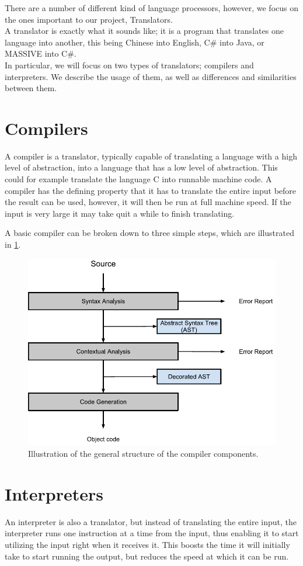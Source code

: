 There are a number of different kind of language processors, however, we focus on the ones important to our project, Translators.\\
A translator is exactly what it sounds like; it is a program that translates one language into another, this being Chinese into English, C\# into Java, or MASSIVE into C\#. \\ \indent 
   In particular, we will focus on two types of translators; compilers and interpreters. We describe the usage of them, as well as differences and similarities between them.

\section{Compilers}
A compiler is a translator, typically capable of translating a language with a high level of abstraction, into a language that has a low level of abstraction. This could for example translate the language C into runnable machine code. A compiler has the defining property that it has to translate the entire input before the result can be used, however, it will then be run at full machine speed. If the input is very large it may take quit a while to finish translating.\\ \indent

A basic compiler can be broken down to three simple steps, which are illustrated in \ref{fig:compiler}.

\begin{figure}[H]
\begin{center}
\includegraphics[scale=0.5]{Images/compiler_drawing.png}
\end{center}
\caption{Illustration of the general structure of the compiler components.}
\label{fig:compiler}
\end{figure}


\section{Interpreters}
An interpreter is also a translator, but instead of translating the entire input, the interpreter runs one instruction at a time from the input, thus enabling it to start utilizing the input right when it receives it. This boosts the time it will initially take to start running the output, but reduces the speed at which it can be run.